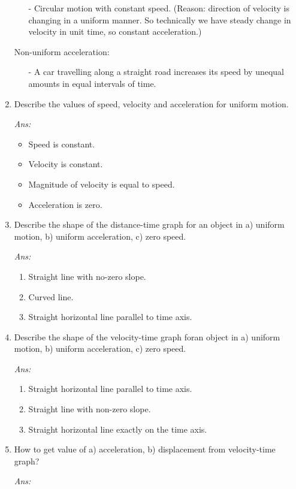 \documentclass[12pt]{article}
\begin{document}
\begin{enumerate}
{\begin{itemize}
				\item[-] Circular motion with constant speed. (Reason: direction of velocity is changing in a uniform manner. So technically we have steady change in velocity in unit time, so constant acceleration.)
			\end{itemize}
			Non-uniform acceleration:
			\begin{itemize}
				\item[-] A car travelling along a straight road increases its speed by unequal amounts in equal intervals of time.
			\end{itemize}
		}
	\item Describe the values of speed, velocity and acceleration for uniform motion.
		{\itshape Ans: 
			\begin{itemize}
				\item Speed is constant.
				\item Velocity is constant.
				\item Magnitude of velocity is equal to speed.
				\item Acceleration is zero.
			\end{itemize}
		}
	\item Describe the shape of the distance-time graph for an object in a) uniform motion, b) uniform acceleration, c) zero speed. \\
		{\itshape Ans: 
			\begin{enumerate}
				\item Straight line with no-zero slope.
				\item Curved line.
				\item Straight horizontal line parallel to time axis.
			\end{enumerate}
		}
	\item Describe the shape of the velocity-time graph foran object in a) uniform motion, b) uniform acceleration, c) zero speed. \\
		{\itshape Ans: 
			\begin{enumerate}
				\item Straight horizontal line parallel to time axis.
				\item Straight line with non-zero slope.
				\item Straight horizontal line exactly on the time axis.
			\end{enumerate}
		}
	\item How to get value of a) acceleration, b) displacement from velocity-time graph? \\
		{\itshape Ans: 
			\begin{enumerate}

\end{enumerate}}
\end{enumerate}
\end{document}

